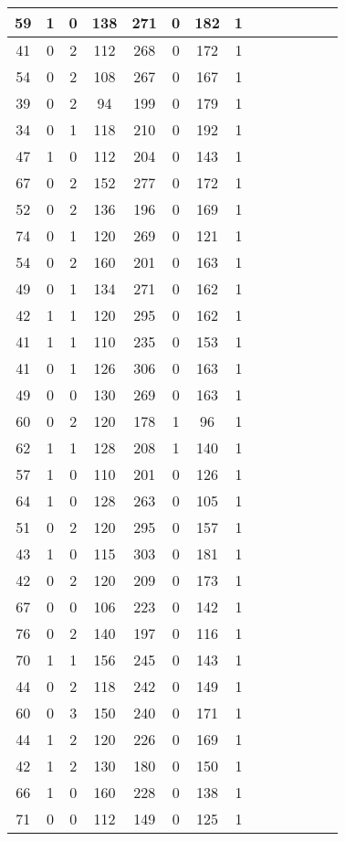 \documentclass{article}
\begin{document}
\begin{longtable}{|c|c|c|c|c|c|c|c|c|c|c|c|c|c|}
\hline
59 & 1 & 0 & 138 & 271 & 0 & 182 & 1\\
\hline
41 & 0 & 2 & 112 & 268 & 0 & 172 & 1\\
\hline
54 & 0 & 2 & 108 & 267 & 0 & 167 & 1\\
\hline
39 & 0 & 2 & 94 & 199 & 0 & 179 & 1\\
\hline
34 & 0 & 1 & 118 & 210 & 0 & 192 & 1\\
\hline
47 & 1 & 0 & 112 & 204 & 0 & 143 & 1\\
\hline
67 & 0 & 2 & 152 & 277 & 0 & 172 & 1\\
\hline
52 & 0 & 2 & 136 & 196 & 0 & 169 & 1\\
\hline
74 & 0 & 1 & 120 & 269 & 0 & 121 & 1\\
\hline
54 & 0 & 2 & 160 & 201 & 0 & 163 & 1\\
\hline
49 & 0 & 1 & 134 & 271 & 0 & 162 & 1\\
\hline
42 & 1 & 1 & 120 & 295 & 0 & 162 & 1\\
\hline
41 & 1 & 1 & 110 & 235 & 0 & 153 & 1\\
\hline
41 & 0 & 1 & 126 & 306 & 0 & 163 & 1\\
\hline
49 & 0 & 0 & 130 & 269 & 0 & 163 & 1\\
\hline
60 & 0 & 2 & 120 & 178 & 1 & 96 & 1\\
\hline
62 & 1 & 1 & 128 & 208 & 1 & 140 & 1\\
\hline
57 & 1 & 0 & 110 & 201 & 0 & 126 & 1\\
\hline
64 & 1 & 0 & 128 & 263 & 0 & 105 & 1\\
\hline
51 & 0 & 2 & 120 & 295 & 0 & 157 & 1\\
\hline
43 & 1 & 0 & 115 & 303 & 0 & 181 & 1\\
\hline
42 & 0 & 2 & 120 & 209 & 0 & 173 & 1\\
\hline
67 & 0 & 0 & 106 & 223 & 0 & 142 & 1\\
\hline
76 & 0 & 2 & 140 & 197 & 0 & 116 & 1\\
\hline
70 & 1 & 1 & 156 & 245 & 0 & 143 & 1\\
\hline
44 & 0 & 2 & 118 & 242 & 0 & 149 & 1\\
\hline
60 & 0 & 3 & 150 & 240 & 0 & 171 & 1\\
\hline
44 & 1 & 2 & 120 & 226 & 0 & 169 & 1\\
\hline
42 & 1 & 2 & 130 & 180 & 0 & 150 & 1\\
\hline
66 & 1 & 0 & 160 & 228 & 0 & 138 & 1\\
\hline
71 & 0 & 0 & 112 & 149 & 0 & 125 & 1\\

\end{longtable}
\end{document}

